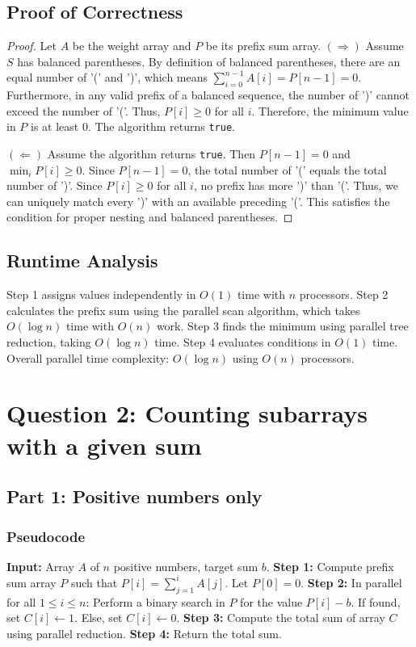 \documentclass{article}
\begin{document}
\subsection{Proof of Correctness}
\begin{proof}
Let $A$ be the weight array and $P$ be its prefix sum array.
$(\Rightarrow)$ Assume $S$ has balanced parentheses. By definition of balanced parentheses, there are an equal number of '(' and ')', which means $\sum_{i=0}^{n-1} A[i] = P[n-1] = 0$. Furthermore, in any valid prefix of a balanced sequence, the number of ')' cannot exceed the number of '('. Thus, $P[i] \ge 0$ for all $i$. Therefore, the minimum value in $P$ is at least 0. The algorithm returns \texttt{true}.

$(\Leftarrow)$ Assume the algorithm returns \texttt{true}. Then $P[n-1] = 0$ and $\min_{i} P[i] \ge 0$. Since $P[n-1] = 0$, the total number of '(' equals the total number of ')'. Since $P[i] \ge 0$ for all $i$, no prefix has more ')' than '('. Thus, we can uniquely match every ')' with an available preceding '('. This satisfies the condition for proper nesting and balanced parentheses.
\end{proof}

\subsection{Runtime Analysis}
Step 1 assigns values independently in $O(1)$ time with $n$ processors.
Step 2 calculates the prefix sum using the parallel scan algorithm, which takes $O(\log n)$ time with $O(n)$ work.
Step 3 finds the minimum using parallel tree reduction, taking $O(\log n)$ time.
Step 4 evaluates conditions in $O(1)$ time.
Overall parallel time complexity: $O(\log n)$ using $O(n)$ processors.

\section{Question 2: Counting subarrays with a given sum}

\subsection{Part 1: Positive numbers only}

\subsubsection{Pseudocode}
\begin{algorithm}
\caption{Count Subarrays with sum $b$ (Positive Array)}
\begin{algorithmic}[1]
\State \textbf{Input:} Array $A$ of $n$ positive numbers, target sum $b$.
\State \textbf{Step 1:} Compute prefix sum array $P$ such that $P[i] = \sum_{j=1}^i A[j]$. Let $P[0] = 0$.
\State \textbf{Step 2:} In parallel for all $1 \le i \le n$:
\State \quad Perform a binary search in $P$ for the value $P[i] - b$.
\State \quad If found, set $C[i] \gets 1$. Else, set $C[i] \gets 0$.
\State \textbf{Step 3:} Compute the total sum of array $C$ using parallel reduction.
\State \textbf{Step 4:} Return the total sum.
\end{algorithmic}
\end{algorithm}
\end{document}
